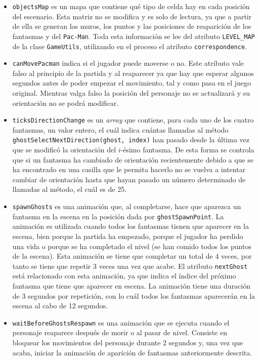 \documentclass[11pt,a4paper]{article}
\begin{document}
\begin{itemize}
	\item \texttt{objectsMap} es un mapa que contiene qué tipo de celda hay en cada posición
	del escenario. Esta matriz no se modifica y es solo de lectura, ya que a partir de ella
	se generan los muros, los puntos y las posiciones de reaparición de los fantasmas y del
	\texttt{Pac-Man}. Toda esta información se lee del atributo \texttt{LEVEL\_MAP} de la
	clase \texttt{GameUtils}, utilizando en el proceso el atributo \texttt{correspondence}.

	\item \texttt{canMovePacman} indica si el jugador puede moverse o no. Este atributo vale
	falso al principio de la partida y al reaparecer ya que hay que esperar algunos segundos
	antes de poder empezar el movimiento, tal y como pasa en el juego original. Mientras valga
	falso la posición del personaje no se actualizará y su orientación no se podrá modificar.
	
	\item \texttt{ticksDirectionChange} es un \textit{array} que contiene, para cada uno
	de los cuatro fantasmas, un valor entero, el cuál indica cuántas llamadas al método
	\texttt{ghostSelectNextDirection(ghost, index)} han pasado desde la última vez que se modificó
	la orientación del $i$-ésimo fantasma. De esta forma se controla que si un fantasma ha
	cambiado de orientación recientemente debido a que se ha encontrado en una casilla que le
	permita hacerlo no se vuelva a intentar cambiar de orientación hasta que hayan pasado un
	número determinado de llamadas al método, el cuál es de 25.
	
	\item \texttt{spawnGhosts} es una animación que, al completarse, hace que aparezca un fantasma
	en la escena en la posición dada por \texttt{ghostSpawnPoint}. La animación es
	utilizada cuando todos los fantasmas tienen que aparecer en la escena, bien porque la partida
	ha empezado, porque el jugador ha perdido una vida o porque se ha completado el nivel (se han
	comido todos los puntos de la escena). Esta animación se tiene que completar un total de 4
	veces, por tanto se tiene que repetir 3 veces una vez que acabe. El atributo
	\texttt{nextGhost} está relacionado con esta animación, ya que indica el índice del próximo
	fantasma que tiene que aparecer en escena. La animación tiene una duración de 3 segundos por
	repetición, con lo cuál todos los fantasmas aparecerán en la escena al cabo de 12 segundos.
	
	\item \texttt{waitBeforeGhostsRespawn} es una animación que se ejecuta cuando el personaje
	reaparece después de morir o al pasar de nivel. Consiste en bloquear los movimientos del
	personaje durante 2 segundos y, una vez que acaba, iniciar la animación de aparición de
	fantasmas anteriormente descrita.
\end{itemize}
\end{document}
